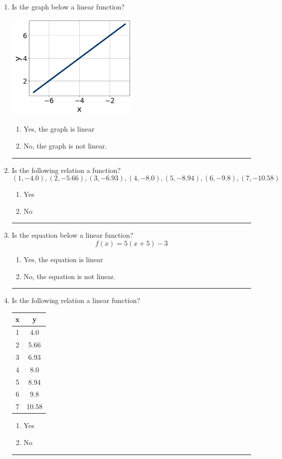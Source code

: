 \documentclass[14pt]{extbook}
\newcommand{\litem}[1]{\item#1\hspace*{-1cm}\rule{\textwidth}{0.4pt}}
\begin{document}
\begin{enumerate}
\litem{
Is the graph below a linear function?
\begin{center}
    \includegraphics[width=0.5\textwidth]{../Figures/MA_8_F_1_2_graphK.png}
\end{center}
\begin{enumerate}[label=\Alph*.]
\item Yes, the graph is linear
\item No, the graph is not linear.

\end{enumerate} }
\litem{
Is the following relation a function?\[ (1, -4.0), (2, -5.66), (3, -6.93), (4, -8.0), (5, -8.94), (6, -9.8), (7, -10.58) \]\begin{enumerate}[label=\Alph*.]
\item Yes
\item No

\end{enumerate} }
\litem{
Is the equation below a linear function?\[ f(x) = 5(x + 5)-3 \]\begin{enumerate}[label=\Alph*.]
\item Yes, the equation is linear
\item No, the equation is not linear.

\end{enumerate} }
\litem{
Is the following relation a linear function?

\begin{tabular}{c|c}
x &y\tabularnewline \hline
1 &4.0\tabularnewline \hline
2 &5.66\tabularnewline \hline
3 &6.93\tabularnewline \hline
4 &8.0\tabularnewline \hline
5 &8.94\tabularnewline \hline
6 &9.8\tabularnewline \hline
7 &10.58\end{tabular}\begin{enumerate}[label=\Alph*.]
\item Yes
\item No

\end{enumerate} }
\end{enumerate}
\end{document}
